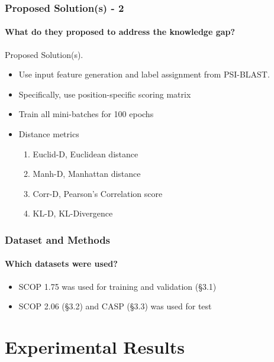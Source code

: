 \documentclass[xcolor={usenames,dvipsnames},hyperref={hyperindex,bookmarks}]{beamer}
\begin{document}
\frame
{
	\frametitle{Proposed Solution(s) - 2}
	\framesubtitle{What do they proposed to address the knowledge gap?}

	Proposed Solution(s).
	\begin{itemize}
	\item Use input feature generation and label assignment from PSI-BLAST.
	\item Specifically, use position-specific scoring matrix
	\item Train all mini-batches for 100 epochs
	\item Distance metrics
		\begin{enumerate} 
		\item Euclid-D, Euclidean distance
		\item Manh-D, Manhattan distance
		\item Corr-D, Pearson's Correlation score
		\item KL-D, KL-Divergence
		\end{enumerate}
	\end{itemize}
}




\frame
{
	\frametitle{Dataset and Methods}
	\framesubtitle{Which datasets were used?}

	\begin{itemize}
	\item SCOP 1.75 was used for training and validation (\S3.1)
	\item SCOP 2.06 (\S3.2) and CASP (\S3.3) was used for test
	\end{itemize}
}














\section{Experimental Results}
\end{document}
